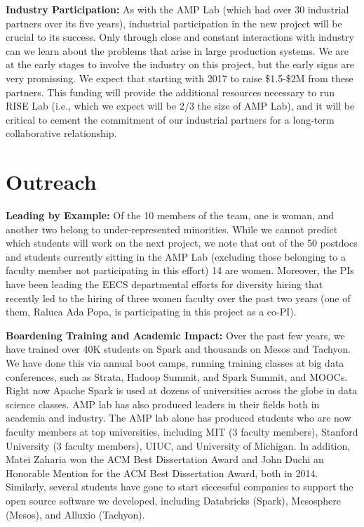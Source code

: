{\bf Industry Participation:} As with the AMP  Lab (which had over 30 industrial partners over its five years), industrial participation in the new project will be crucial to its success.  Only through close and constant interactions with industry can we learn about the problems that arise in large production systems.  We are at the early stages to involve the industry on this project, but the early signs are very promissing. We expect that starting with 2017 to raise \$1.5-\$2M from these partners. This funding will provide the additional resources necessary to run RISE Lab (i.e., which we expect will be 2/3 the size of AMP Lab), and it will be critical to cement the commitment of our industrial partners for a long-term collaborative relationship.

\section{Outreach}


{\bf Leading by Example:} Of the 10 members of the team, one is woman, and another two belong to under-represented minorities.  While we cannot predict which students will work on the next project, we note that out of the 50 postdocs and students currently sitting in the AMP Lab (excluding those belonging to a faculty member not participating in this effort) 14 are women.  Moreover, the PIs have been leading the EECS departmental efforts for diversity hiring that recently led to the hiring of three women faculty over the past two years (one of them, Raluca Ada Popa, is participating in this project as a co-PI).

{\bf Boardening Training and Academic Impact:} Over the past few years, we have trained over 40K students on Spark and thousands on Mesos and Tachyon. We have done this via annual boot camps, running training classes at big data conferences, such as Strata, Hadoop Summit, and Spark Summit, and MOOCs.  Right now Apache Spark is used at dozens of universities across the globe in data science classes. AMP lab has also produced leaders in their fields both in academia and  industry. The AMP lab alone has produced students who are now faculty members at top universities, including MIT (3 faculty members), Stanford University (3 faculty members), UIUC, and University of Michigan. In addition, Matei Zaharia won the ACM Best Dissertation Award and John Duchi an Honorable Mention for the ACM Best Dissertation Award, both in 2014. Similarly, several students have gone to start siccessful companies to support the open source software we developed, including Databricks (Spark), Mesosphere (Mesos), and Alluxio (Tachyon). 

